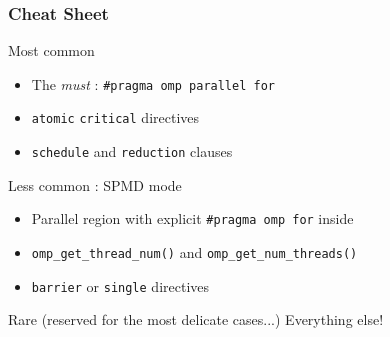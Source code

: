 \documentclass{beamer}
\begin{document}
\begin{frame}[fragile=singleslide]
  \frametitle{Cheat Sheet}

  \begin{exampleblock}{Most common}
    \begin{itemize}
    \item The \textit{must} : \verb|#pragma omp parallel for|
    \item \verb|atomic|  \verb|critical| directives
    \item \verb|schedule| and \verb|reduction| clauses
    \end{itemize}
  \end{exampleblock}

  \begin{block}{Less common : SPMD mode}
    \begin{itemize}
    \item Parallel region with explicit \verb|#pragma omp for| inside
    \item \verb|omp_get_thread_num()| and \verb|omp_get_num_threads()|
    \item \verb|barrier| or \verb|single| directives
    \end{itemize}
  \end{block}

  \begin{alertblock}{Rare (reserved for the most delicate cases...)}
    Everything else!
  \end{alertblock}
\end{frame}



\end{document}
